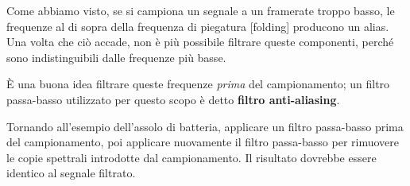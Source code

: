 \documentclass[12pt]{book} \usepackage[width=5.5in,height=8.5in, hmarginratio=3:2,vmarginratio=1:1]{geometry}
\begin{document}
\begin{exercise} Come abbiamo visto, se si campiona un segnale a un framerate troppo basso, le frequenze al di sopra della frequenza di piegatura [folding] producono un alias. Una volta che ciò accade, non è più possibile filtrare queste componenti, perché sono indistinguibili dalle frequenze più basse.

È una buona idea filtrare queste frequenze {\em prima} del campionamento; un filtro passa-basso utilizzato per questo scopo è detto {\bf filtro anti-aliasing}.

Tornando all'esempio dell'assolo di batteria, applicare un filtro passa-basso prima del campionamento, poi applicare nuovamente il filtro passa-basso per rimuovere le copie spettrali introdotte dal campionamento. Il risultato dovrebbe essere identico al segnale filtrato. \end{exercise} 

\backmatter

\printindex
\end{document}
